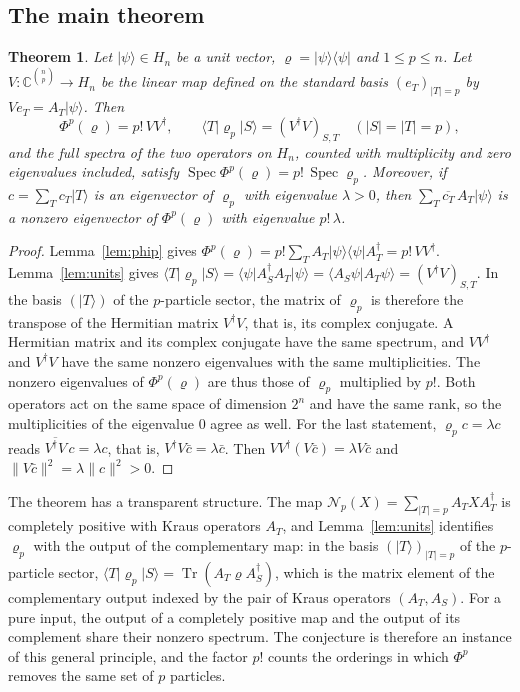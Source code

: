 \documentclass[11pt,a4paper]{article}
\newtheorem{theorem}{Theorem}
\theoremstyle{definition}
\theoremstyle{plain}
\DeclareMathOperator{\Tr}{Tr}
\DeclareMathOperator{\Spec}{Spec}
\newcommand{\ket}[1]{\lvert#1\rangle}
\newcommand{\bra}[1]{\langle#1\rvert}
\newcommand{\braket}[2]{\langle#1\vert#2\rangle}
\newcommand{\norm}[1]{\lVert#1\rVert}
\newcommand{\C}{\mathbb{C}}
\begin{document}
\subsection{The main theorem}

\begin{theorem}\label{thm:main}
Let $\ket\psi\in H_n$ be a unit vector, $\varrho=\ket\psi\bra\psi$ and
$1\le p\le n$. Let $V:\C^{\binom np}\to H_n$ be the linear map defined on the
standard basis $(e_T)_{|T|=p}$ by $Ve_T=A_T\ket\psi$. Then
\[
\Phi^p(\varrho)=p!\,VV^\dagger,\qquad
\bra T\varrho_p\ket S=(V^\dagger V)_{S,T}\quad(|S|=|T|=p),
\]
and the full spectra of the two operators on $H_n$, counted with
multiplicity and zero eigenvalues included, satisfy
$\Spec\Phi^p(\varrho)=p!\,\Spec\varrho_p$. Moreover, if
$c=\sum_Tc_T\ket T$ is an eigenvector of $\varrho_p$ with eigenvalue
$\lambda>0$, then $\sum_T\overline{c_T}\,A_T\ket\psi$ is a nonzero
eigenvector of $\Phi^p(\varrho)$ with eigenvalue $p!\,\lambda$.
\end{theorem}

\begin{proof}
Lemma~\ref{lem:phip} gives
$\Phi^p(\varrho)=p!\sum_TA_T\ket\psi\bra\psi A_T^\dagger=p!\,VV^\dagger$.
Lemma~\ref{lem:units} gives
$\bra T\varrho_p\ket S=\bra\psi A_S^\dagger A_T\ket\psi
=\braket{A_S\psi}{A_T\psi}=(V^\dagger V)_{S,T}$. In the basis $(\ket T)$ of
the $p$-particle sector, the matrix of $\varrho_p$ is therefore the transpose
of the Hermitian matrix $V^\dagger V$, that is, its complex conjugate. A
Hermitian matrix and its complex conjugate have the same spectrum, and
$VV^\dagger$ and $V^\dagger V$ have the same nonzero eigenvalues with the same
multiplicities. The nonzero eigenvalues of $\Phi^p(\varrho)$ are thus those
of $\varrho_p$ multiplied by $p!$. Both operators act on the same space of
dimension $2^n$ and have the same rank, so the multiplicities of the
eigenvalue $0$ agree as well. For the last statement, $\varrho_pc=\lambda c$
reads $\overline{V^\dagger V}\,c=\lambda c$, that is,
$V^\dagger V\bar c=\lambda\bar c$. Then
$VV^\dagger(V\bar c)=\lambda V\bar c$ and
$\norm{V\bar c}^2=\lambda\norm c^2>0$.
\end{proof}

The theorem has a transparent structure. The map
$\mathcal N_p(X)=\sum_{|T|=p}A_TXA_T^\dagger$ is completely positive with
Kraus operators $A_T$, and Lemma~\ref{lem:units} identifies $\varrho_p$ with
the output of the complementary map: in the basis $(\ket T)_{|T|=p}$ of the
$p$-particle sector, $\bra T\varrho_p\ket S=\Tr(A_T\varrho A_S^\dagger)$,
which is the matrix element of the complementary output indexed by the pair
of Kraus operators $(A_T,A_S)$. For a pure input, the output of a
completely positive map and the output of its complement share their nonzero
spectrum. The conjecture is therefore an instance of this general principle,
and the factor $p!$ counts the orderings in which $\Phi^p$ removes the same
set of $p$ particles.
\end{document}
